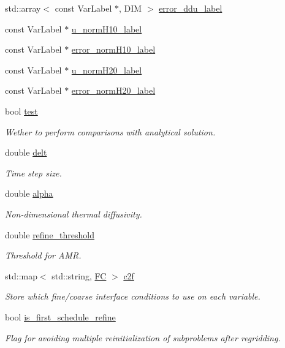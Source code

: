\begin{DoxyCompactItemize}
\item 
std\+::array$<$ const Var\+Label $\ast$, D\+IM $>$ \hyperlink{classUintah_1_1PhaseField_1_1Heat_aa06848deb21efd5d0f8b086cd9b563ec}{error\+\_\+ddu\+\_\+label}
\item 
const Var\+Label $\ast$ \hyperlink{classUintah_1_1PhaseField_1_1Heat_acddad73b120372c5929039787359c9fe}{u\+\_\+norm\+H10\+\_\+label}
\item 
const Var\+Label $\ast$ \hyperlink{classUintah_1_1PhaseField_1_1Heat_a809e43b5076b5778af2f6c2a10ce97a6}{error\+\_\+norm\+H10\+\_\+label}
\item 
const Var\+Label $\ast$ \hyperlink{classUintah_1_1PhaseField_1_1Heat_a47032b7137df200ce4990faf6f65188d}{u\+\_\+norm\+H20\+\_\+label}
\item 
const Var\+Label $\ast$ \hyperlink{classUintah_1_1PhaseField_1_1Heat_ae5fd87bfc6b64d1e72339b4ad860b126}{error\+\_\+norm\+H20\+\_\+label}
\item 
bool \hyperlink{classUintah_1_1PhaseField_1_1Heat_a46a2d7d28834fab61dd63c8c3a2d46a9}{test}
\begin{DoxyCompactList}\small\item\em Wether to perform comparisons with analytical solution. \end{DoxyCompactList}\item 
double \hyperlink{classUintah_1_1PhaseField_1_1Heat_a5aa8d04b6e7177e1a3511ac2fac00a96}{delt}
\begin{DoxyCompactList}\small\item\em Time step size. \end{DoxyCompactList}\item 
double \hyperlink{classUintah_1_1PhaseField_1_1Heat_ab3cee68f7769a98af80877daa13e038b}{alpha}
\begin{DoxyCompactList}\small\item\em Non-\/dimensional thermal diffusivity. \end{DoxyCompactList}\item 
double \hyperlink{classUintah_1_1PhaseField_1_1Heat_aff3739ebcad41c592dcdb5a92b6abb52}{refine\+\_\+threshold}
\begin{DoxyCompactList}\small\item\em Threshold for A\+MR. \end{DoxyCompactList}\item 
std\+::map$<$ std\+::string, \hyperlink{namespaceUintah_1_1PhaseField_aeb51fe956fe07f1487f5878f4039f27c}{FC} $>$ \hyperlink{classUintah_1_1PhaseField_1_1Heat_a4bd64df2d939420f13553008da93cfb5}{c2f}
\begin{DoxyCompactList}\small\item\em Store which fine/coarse interface conditions to use on each variable. \end{DoxyCompactList}\item 
bool \hyperlink{classUintah_1_1PhaseField_1_1Heat_a87604ddeef664dc858efd1603513fb18}{is\+\_\+first\+\_\+schedule\+\_\+refine}
\begin{DoxyCompactList}\small\item\em Flag for avoiding multiple reinitialization of subproblems after regridding. \end{DoxyCompactList}\end{DoxyCompactItemize}
